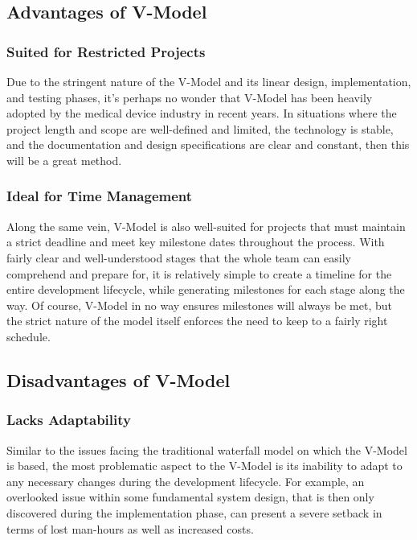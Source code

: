 \documentclass[main.tex]{subfiles}
\begin{document}
\subsection{Advantages of V-Model}

\subsubsection{Suited for Restricted Projects}
Due to the stringent nature of the V-Model and its linear design, implementation, and testing phases, it's perhaps no wonder that V-Model has been heavily adopted by the medical device industry in recent years.
In situations where the project length and scope are well-defined and limited, the technology is stable, and the documentation and design specifications are clear and constant, then this will be a great method.

\subsubsection{Ideal for Time Management}
Along the same vein, V-Model is also well-suited for projects that must maintain a strict deadline and meet key milestone dates throughout the process.
With fairly clear and well-understood stages that the whole team can easily comprehend and prepare for, it is relatively simple to create a timeline for the entire development lifecycle, while generating milestones for each stage along the way. Of course, V-Model in no way ensures milestones will always be met, but the strict nature of the model itself enforces the need to keep to a fairly right schedule.

\subsection{Disadvantages of V-Model}

\subsubsection{Lacks Adaptability}
Similar to the issues facing the traditional waterfall model on which the V-Model is based, the most problematic aspect to the V-Model is its inability to adapt to any necessary changes during the development lifecycle. For example, an overlooked issue within some fundamental system design, that is then only discovered during the implementation phase, can present a severe setback in terms of lost man-hours as well as increased costs.
\end{document}
